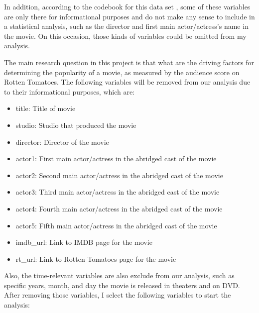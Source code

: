 \documentclass{article}
\begin{document}
In addition, according to the codebook for this data set \citep{Runde2020}, some of these variables are only there for informational purposes and do not make any sense to include in a statistical analysis, such as the director and first main actor/actress's name in the movie.  On this occasion, those kinds of variables could be omitted from my analysis.

The main research question in this project is that what are the driving factors for determining the popularity of a movie, as measured by the audience score on Rotten Tomatoes. The following variables will be removed from our analysis due to their informational purposes, which are:

\vspace{-0.5cm}
\begin{itemize}
\setlength\itemsep{-0.5em}
\item title: Title of movie
\item studio: Studio that produced the movie
\item director: Director of the movie
\item actor1: First main actor/actress in the abridged cast of the movie
\item actor2: Second main actor/actress in the abridged cast of the movie
\item actor3: Third main actor/actress in the abridged cast of the movie
\item actor4: Fourth main actor/actress in the abridged cast of the movie
\item actor5: Fifth main actor/actress in the abridged cast of the movie
\item imdb\_url:  Link to IMDB page for the movie
\item rt\_url: Link to Rotten Tomatoes page for the movie
\end{itemize}

Also, the time-relevant variables are also exclude from our analysis, such as specific years, month, and day the movie is released in theaters and on DVD. After removing those variables, I select the following variables to start the analysis:
\end{document}
